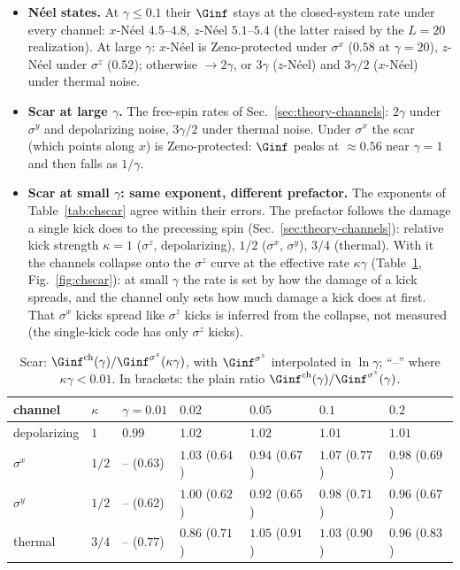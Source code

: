 \begin{itemize}
\item \textbf{N\'eel states.} At $\gamma \le 0.1$ their $\Ginf$ stays at the closed-system rate under every channel: $x$-N\'eel $4.5$--$4.8$, $z$-N\'eel $5.1$--$5.4$ (the latter raised by the $L = 20$ realization). At large $\gamma$: $x$-N\'eel is Zeno-protected under $\sigma^x$ ($0.58$ at $\gamma = 20$), $z$-N\'eel under $\sigma^z$ ($0.52$); otherwise $\to 2\gamma$, or $3\gamma$ ($z$-N\'eel) and $3\gamma/2$ ($x$-N\'eel) under thermal noise.
\item \textbf{Scar at large $\gamma$.} The free-spin rates of Sec.~\ref{sec:theory-channels}: $2\gamma$ under $\sigma^y$ and depolarizing noise, $3\gamma/2$ under thermal noise. Under $\sigma^x$ the scar (which points along $x$) is Zeno-protected: $\Ginf$ peaks at $\approx 0.56$ near $\gamma = 1$ and then falls as $1/\gamma$.
\item \textbf{Scar at small $\gamma$: same exponent, different prefactor.} The exponents of Table~\ref{tab:chscar} agree within their errors. The prefactor follows the damage a single kick does to the precessing spin (Sec.~\ref{sec:theory-channels}): relative kick strength $\kappa = 1$ ($\sigma^z$, depolarizing), $1/2$ ($\sigma^x$, $\sigma^y$), $3/4$ (thermal). With it the channels collapse onto the $\sigma^z$ curve at the effective rate $\kappa\gamma$ (Table~\ref{tab:kappa}, Fig.~\ref{fig:chscar}): at small $\gamma$ the rate is set by how the damage of a kick spreads, and the channel only sets how much damage a kick does at first. That $\sigma^x$ kicks spread like $\sigma^z$ kicks is inferred from the collapse, not measured (the single-kick code has only $\sigma^z$ kicks).
\end{itemize}

\begin{table}[H]
\centering
\small
\begin{tabular}{lllllll}
\toprule
channel & $\kappa$ & $\gamma = 0.01$ & $0.02$ & $0.05$ & $0.1$ & $0.2$ \\
\midrule
depolarizing & $1$ & $0.99$ & $1.02$ & $1.02$ & $1.01$ & $1.01$ \\
$\sigma^x$ & $1/2$ & -- \;($0.63$) & $1.03$ \;($0.64$) & $0.94$ \;($0.67$) & $1.07$ \;($0.77$) & $0.98$ \;($0.69$) \\
$\sigma^y$ & $1/2$ & -- \;($0.62$) & $1.00$ \;($0.62$) & $0.92$ \;($0.65$) & $0.98$ \;($0.71$) & $0.96$ \;($0.67$) \\
thermal & $3/4$ & -- \;($0.77$) & $0.86$ \;($0.71$) & $1.05$ \;($0.91$) & $1.03$ \;($0.90$) & $0.96$ \;($0.83$) \\
\bottomrule
\end{tabular}
\caption{Scar: $\Ginf^{\mathrm{ch}}(\gamma)/\Ginf^{\sigma^z}(\kappa\gamma)$, with $\Ginf^{\sigma^z}$ interpolated in $\ln\gamma$; ``--'' where $\kappa\gamma < 0.01$. In brackets: the plain ratio $\Ginf^{\mathrm{ch}}(\gamma)/\Ginf^{\sigma^z}(\gamma)$.}
\label{tab:kappa}
\end{table}

